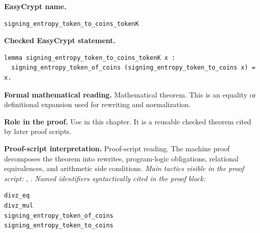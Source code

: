 \begin{formaltheorem}
\noindent\textbf{EasyCrypt name.}
\begin{lstlisting}[language=EasyCrypt,basicstyle=\ttfamily\scriptsize]
signing_entropy_token_to_coins_tokenK
\end{lstlisting}
\noindent\textbf{Checked EasyCrypt statement.}
\begin{lstlisting}[language=EasyCrypt,basicstyle=\ttfamily\scriptsize]
lemma signing_entropy_token_to_coins_tokenK x :
  signing_entropy_token_of_coins (signing_entropy_token_to_coins x) = x.
\end{lstlisting}
\noindent\textbf{Formal mathematical reading.}
Mathematical theorem. This is an equality or definitional expansion used for rewriting and normalization.

\noindent\textbf{Role in the proof.}
Use in this chapter. It is a reusable checked theorem cited by later proof scripts.

\noindent\textbf{Proof-script interpretation.}
Proof-script reading. The machine proof decomposes the theorem into rewrites, program-logic obligations, relational equivalences, and arithmetic side conditions.
\emph{Main tactics visible in the proof script:} , .
\emph{Named identifiers syntactically cited in the proof block:}
\begin{lstlisting}[language=EasyCrypt,basicstyle=\ttfamily\scriptsize]
divz_eq
divz_mul
signing_entropy_token_of_coins
signing_entropy_token_to_coins
\end{lstlisting}

\end{formaltheorem}

